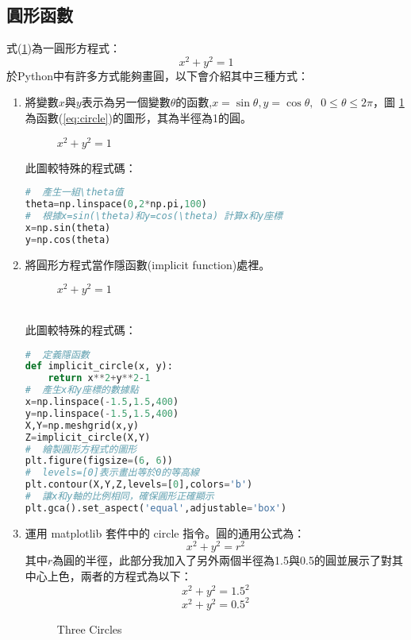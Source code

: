 \documentclass[12pt, a4paper]{article}
\begin{document}
\subsection{圓形函數}
式(\ref{fig:circle_1})為一圓形方程式：
\begin{equation}\label{eq:circle}
x^2+y^2=1
\end{equation}
於Python中有許多方式能夠畫圓，以下會介紹其中三種方式：
\begin{enumerate}
\item 將變數$x$與$y$表示為另一個變數$\theta$的函數,$x=\sin \theta, y = \cos \theta, \;\; 0 \leq \theta \leq 2\pi$，圖 \ref{fig:circle_1} 為函數(\ref{eq:circle})的圖形，其為半徑為1的圓。\\
\begin{figure}[h]
    \caption{$x^2+y^2=1$}
    \label{fig:circle_1}
\end{figure}
此圖較特殊的程式碼：
\begin{lstlisting}[language=Python]
#  產生一組\theta值
theta=np.linspace(0,2*np.pi,100)
#  根據x=sin(\theta)和y=cos(\theta) 計算x和y座標
x=np.sin(theta)
y=np.cos(theta)
\end{lstlisting}
\item 將圓形方程式當作隱函數(implicit function)處裡。
\begin{figure}[h]
    \caption{$x^2+y^2=1$}
    \label{fig:circle_2}
\end{figure}\\
此圖較特殊的程式碼：
\begin{lstlisting}[language=Python]
#  定義隱函數
def implicit_circle(x, y):
    return x**2+y**2-1
#  產生x和y座標的數據點
x=np.linspace(-1.5,1.5,400)
y=np.linspace(-1.5,1.5,400)
X,Y=np.meshgrid(x,y)
Z=implicit_circle(X,Y)
#  繪製圓形方程式的圖形
plt.figure(figsize=(6, 6))
#  levels=[0]表示畫出等於0的等高線
plt.contour(X,Y,Z,levels=[0],colors='b')  
#  讓x和y軸的比例相同，確保圓形正確顯示
plt.gca().set_aspect('equal',adjustable='box')  
\end{lstlisting}
\item  運用 matplotlib 套件中的 circle 指令。圓的通用公式為：
$$x^2+y^2=r^2$$
其中$r$為圓的半徑，此部分我加入了另外兩個半徑為1.5與0.5的圓並展示了對其中心上色，兩者的方程式為以下：
$$x^2+y^2=1.5^2$$
$$x^2+y^2=0.5^2$$
\begin{figure}[h]
    \caption{Three Circles}

\end{figure}
\end{enumerate}
\end{document}
